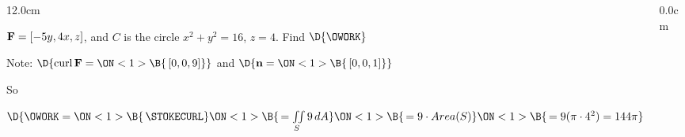 \begin{frame}
\begin{columns}\begin{column}{12.0cm}
\scriptsize

\EX ${\bf F} = [-5y,4x,z]$, and $C$ is the circle $x^2 + y^2 = 16$, $z=4$. \quad Find $\D{\OWORK}$

\vspace{0.4cm}

Note:
$\D{
\text{curl}\, {\bf F} =
\ON<1>{\B{\, [0,0,9]}}}$ \quad and $\D{{\bf n} = 
\ON<1>{\B{\,[0,0,1]}}}$

\vspace{0.4cm}

So 

\vspace{0.4cm}

$\D{\OWORK = 
\ON<1>{\B{\,\STOKECURL}}
\ON<1>{\B{\, = \iint \limits_{S} 9\, dA}}
\ON<1>{\B{\, = 9 \cdot Area(S)}}
\ON<1>{\B{\, = 9 (\pi \cdot 4^2) = 144 \pi}}}$

\vspace{9.2cm}

\end{column}\begin{column}{0.0cm}\end{column}\end{columns}
\end{frame}


